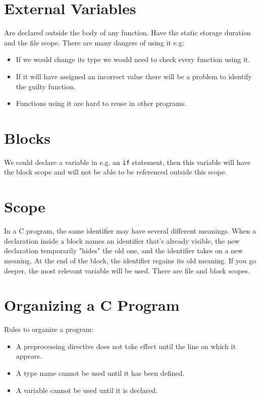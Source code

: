 \documentclass[openany]{book}
\begin{document}
    \section{External Variables}
    Are declared outside the body of any function. Have the static storage duration and the file scope. There are many dangers of using it e.g:
    \begin{itemize}
        \item If we would change its type we would need to check every function using it.
        \item If it will have assigned an incorrect value there will be a problem to identify the guilty function.
        \item Functions using it are hard to reuse in other programs.
    \end{itemize}
    
    \section{Blocks}
    We could declare a variable in e.g. an \texttt{if} statement, then this variable will have the block scope and will not be able to be referenced outside this scope.
    
    \section{Scope}
    In a C program, the same identifier may have several different meanings. When a declaration inside a block names an identifier that's already visible, the new declaration temporarily "hides" the old one, and the identifier takes on a new meaning. At the end of the block, the identifier regains its old meaning. If you go deeper, the most relevant variable will be used. There are file and block scopes.
    
    \section{Organizing a C Program}
    Rules to organize a program:
    \begin{itemize}
        \item A preprocessing directive does not take effect until the line on which it appears.
        \item A type name cannot be used until it has been defined.
        \item A variable cannot be used until it is declared.
    \end{itemize}
\end{document}
